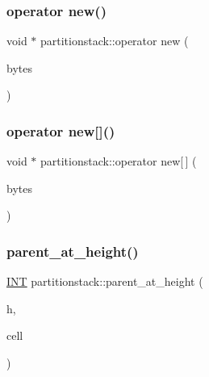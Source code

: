 \mbox{\label{classpartitionstack_abb167d14c982f5f5a9a3d2011465b6de}} 
\subsubsection{\texorpdfstring{operator new()}{operator new()}}
{\footnotesize\ttfamily void $\ast$ partitionstack\+::operator new (\begin{DoxyParamCaption}\item[{size\+\_\+t}]{bytes }\end{DoxyParamCaption})}

\mbox{\label{classpartitionstack_a5374438377fe175c370f1e7fc5fb2e5b}} 
\subsubsection{\texorpdfstring{operator new[]()}{operator new[]()}}
{\footnotesize\ttfamily void $\ast$ partitionstack\+::operator new\mbox{[}$\,$\mbox{]} (\begin{DoxyParamCaption}\item[{size\+\_\+t}]{bytes }\end{DoxyParamCaption})}

\mbox{\label{classpartitionstack_a56f2d05a29ef6612d67126163e368ffa}} 
\subsubsection{\texorpdfstring{parent\+\_\+at\+\_\+height()}{parent\_at\_height()}}
{\footnotesize\ttfamily \mbox{\hyperlink{galois_8h_a09fddde158a3a20bd2dcadb609de11dc}{I\+NT}} partitionstack\+::parent\+\_\+at\+\_\+height (\begin{DoxyParamCaption}\item[{\mbox{\hyperlink{galois_8h_a09fddde158a3a20bd2dcadb609de11dc}{I\+NT}}}]{h,  }\item[{\mbox{\hyperlink{galois_8h_a09fddde158a3a20bd2dcadb609de11dc}{I\+NT}}}]{cell }\end{DoxyParamCaption})}

